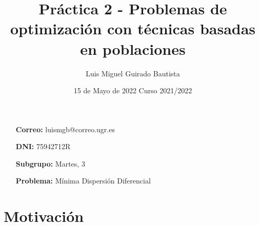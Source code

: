 \documentclass{article}
\title{Práctica 2 - Problemas de optimización con técnicas basadas en poblaciones}
\author{Luis Miguel Guirado Bautista}
\date{15 de Mayo de 2022 \qquad Curso 2021/2022}
\begin{document}
    \begin{titlepage}
        \maketitle
        \thispagestyle{empty}
        \begin{enumerate}
            \item[\textbf{Correo:}]luismgb@correo.ugr.es
            \item[\textbf{DNI:}]75942712R
            \item[\textbf{Subgrupo:}]Martes, 3
            \item[\textbf{Problema:}]Mínima Dispersión Diferencial 
        \end{enumerate}
    \end{titlepage}

    \pagebreak

    \tableofcontents

    \pagebreak
    \rfoot{\thepage}
    \section{Motivación}

    
\end{document}

